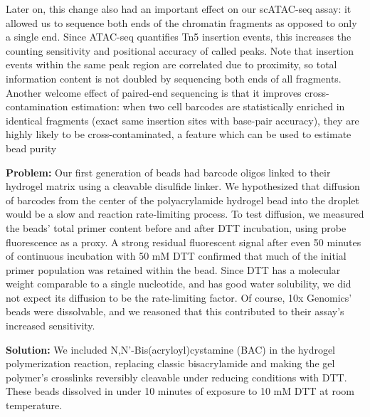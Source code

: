 
Later on, this change also had an important effect on our scATAC-seq assay: it allowed us to sequence both ends of the chromatin fragments as opposed to only a single end. Since ATAC-seq quantifies Tn5 insertion events, this increases the counting sensitivity and positional accuracy of called peaks. Note that insertion events within the same peak region are correlated due to proximity, so total information content is not doubled by sequencing both ends of all fragments. Another welcome effect of paired-end sequencing is that it improves cross-contamination estimation: when two cell barcodes are statistically enriched in identical fragments (exact same insertion sites with base-pair accuracy), they are highly likely to be cross-contaminated, a feature which can be used to estimate bead purity


\textbf{Problem:} Our first generation of beads had barcode oligos linked to their hydrogel matrix using a cleavable disulfide linker. We hypothesized that diffusion of barcodes from the center of the polyacrylamide hydrogel bead into the droplet would be a slow and reaction rate-limiting process. To test diffusion, we measured the beads' total primer content before and after DTT incubation, using probe fluorescence as a proxy. A strong residual fluorescent signal after even 50 minutes of continuous incubation with 50 mM DTT confirmed that much of the initial primer population was retained within the bead. Since DTT has a molecular weight comparable to a single nucleotide, and has good water solubility, we did not expect its diffusion to be the rate-limiting factor. Of course, 10x Genomics' beads were dissolvable, and we reasoned that this contributed to their assay's increased sensitivity.

\textbf{Solution:} We included N,N'-Bis(acryloyl)cystamine (BAC) in the hydrogel polymerization reaction, replacing classic bisacrylamide and making the gel polymer's crosslinks reversibly cleavable under reducing conditions with DTT. These beads dissolved in under 10 minutes of exposure to 10 mM DTT at room temperature.

